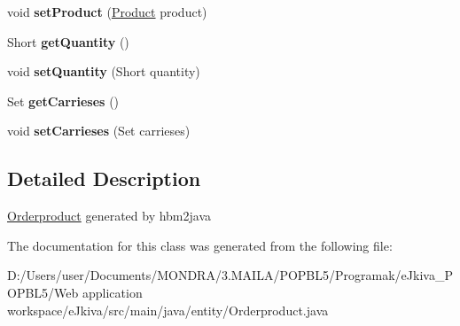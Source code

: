 \begin{DoxyCompactItemize}
void {\bfseries set\+Product} (\mbox{\hyperlink{classentity_1_1_product}{Product}} product)
\item 
\mbox{\label{classentity_1_1_orderproduct_ab5c29051d9c82cd8b58c482c0934e461}} 
Short {\bfseries get\+Quantity} ()
\item 
\mbox{\label{classentity_1_1_orderproduct_a03c68a57dc48f62811ce465f306c10c4}} 
void {\bfseries set\+Quantity} (Short quantity)
\item 
\mbox{\label{classentity_1_1_orderproduct_a965f1fe5483bee8e7283a72730f601cb}} 
Set {\bfseries get\+Carrieses} ()
\item 
\mbox{\label{classentity_1_1_orderproduct_aa83441f5b5a63df9edfdf8cd9503bd6f}} 
void {\bfseries set\+Carrieses} (Set carrieses)
\end{DoxyCompactItemize}


\subsection{Detailed Description}
\mbox{\hyperlink{classentity_1_1_orderproduct}{Orderproduct}} generated by hbm2java 

The documentation for this class was generated from the following file\+:\begin{DoxyCompactItemize}
\item 
D\+:/\+Users/user/\+Documents/\+M\+O\+N\+D\+R\+A/3.\+M\+A\+I\+L\+A/\+P\+O\+P\+B\+L5/\+Programak/e\+Jkiva\+\_\+\+P\+O\+P\+B\+L5/\+Web application workspace/e\+Jkiva/src/main/java/entity/Orderproduct.\+java\end{DoxyCompactItemize}
